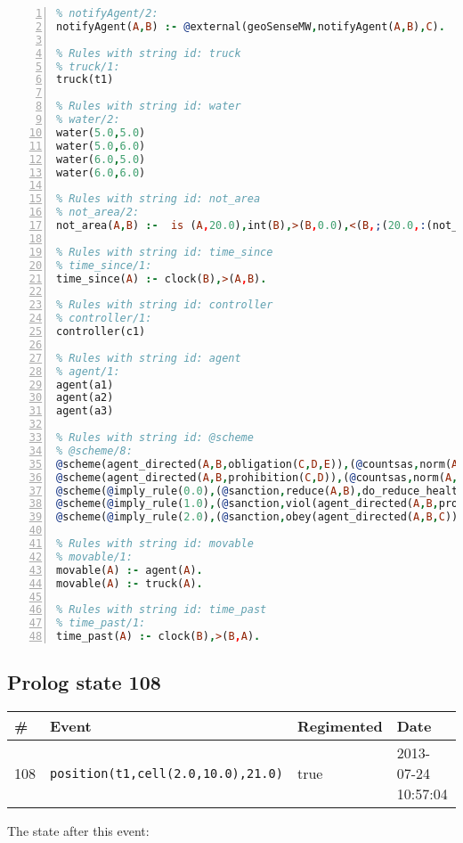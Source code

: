 \documentclass[11pt]{article}\usepackage[utf8]{inputenc}\usepackage{geometry}
\begin{document}
\begin{lstlisting}[language=Prolog, numbers=left]
% Rules with string id: notifyAgent
% notifyAgent/2:
notifyAgent(A,B) :- @external(geoSenseMW,notifyAgent(A,B),C).

% Rules with string id: truck
% truck/1:
truck(t1)

% Rules with string id: water
% water/2:
water(5.0,5.0)
water(5.0,6.0)
water(6.0,5.0)
water(6.0,6.0)

% Rules with string id: not_area
% not_area/2:
not_area(A,B) :-  is (A,20.0),int(B),>(B,0.0),<(B,;(20.0,:(not_area(A,B), is (-(B),20.0)))),int(A),>(A,0.0),<(A,;(20.0,:(area(A,B),-(int(A))))),int(B),>(A,0.0),>(B,0.0),<(A,21.0),<(B,21.0).

% Rules with string id: time_since
% time_since/1:
time_since(A) :- clock(B),>(A,B).

% Rules with string id: controller
% controller/1:
controller(c1)

% Rules with string id: agent
% agent/1:
agent(a1)
agent(a2)
agent(a3)

% Rules with string id: @scheme
% @scheme/8:
@scheme(agent_directed(A,B,obligation(C,D,E)),(@countsas,norm(A,B,F,obligation(C,D,E)),F),false,(listTrue(C)),(time_past(D)),false,[plus(viol(agent_directed(A,B,obligation(C,D,E))))|[]],[plus(obey(agent_directed(A,B,obligation(C,D,E))))|[]])
@scheme(agent_directed(A,B,prohibition(C,D)),(@countsas,norm(A,B,E,prohibition(C,D)),E),(listTrue(C)),false,(false),false,[plus(viol(agent_directed(A,B,prohibition(C,D))))|[]],[plus(obey(agent_directed(A,B,prohibition(C,D))))|[]])
@scheme(@imply_rule(0.0),(@sanction,reduce(A,B),do_reduce_health(A,B),notifyAgent(A,changed(status))),true,false,false,false,[min(reduce(A,B))|[]],[])
@scheme(@imply_rule(1.0),(@sanction,viol(agent_directed(A,B,prohibition(C,D))),do_sanction(D)),true,false,false,false,[min(viol(agent_directed(A,B,prohibition(C,D))))|[]],[])
@scheme(@imply_rule(2.0),(@sanction,obey(agent_directed(A,B,C))),true,false,false,false,[min(obey(agent_directed(A,B,C)))|[]],[])

% Rules with string id: movable
% movable/1:
movable(A) :- agent(A).
movable(A) :- truck(A).

% Rules with string id: time_past
% time_past/1:
time_past(A) :- clock(B),>(B,A).

\end{lstlisting}
\clearpage 
\subsection{Prolog state 108}
\begin{table}[ht]
\centering 
\begin{tabular}{l l l l} 
\textbf{\#} & \textbf{Event} & \textbf{Regimented} & \textbf{Date} \\ [0.5ex] 
\hline
108&\texttt{position(t1,cell(2.0,10.0),21.0)}&true&2013-07-24 10:57:04\\ [1ex] \hline\end{tabular}
\end{table}
The state after this event:
\end{document}
